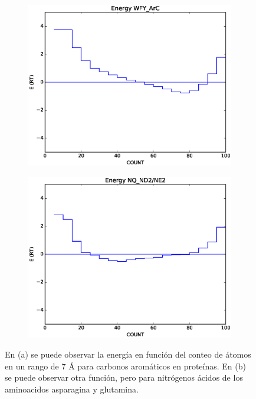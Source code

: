 \begin{figure}[p]
\centering
\begin{subfigure}{.8\textwidth}
\centering
\includegraphics[width=\textwidth]{figures/prot_pot/coarse/aromatic.eps}
\caption{}
\end{subfigure}

\begin{subfigure}{.8\textwidth}
\centering
\includegraphics[width=\textwidth]{figures/prot_pot/coarse/nh_acids.eps}
\caption{}
\end{subfigure}
\caption[Ejemplos de funciones de energía para conteo de átomos en proteínas]{En (a) se puede observar la energía en función del conteo de átomos en un rango de 7 \si{\angstrom} para carbonos aromáticos en proteínas. En (b) se puede observar otra función, pero para nitrógenos ácidos de los aminoacidos asparagina y glutamina.}
\label{fig:inteng}
\end{figure}
\cleardoublepage

